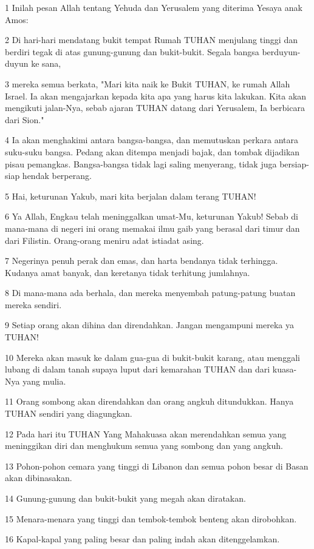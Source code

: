 \par 1 Inilah pesan Allah tentang Yehuda dan Yerusalem yang diterima Yesaya anak Amos:
\par 2 Di hari-hari mendatang bukit tempat Rumah TUHAN menjulang tinggi dan berdiri tegak di atas gunung-gunung dan bukit-bukit. Segala bangsa berduyun-duyun ke sana,
\par 3 mereka semua berkata, "Mari kita naik ke Bukit TUHAN, ke rumah Allah Israel. Ia akan mengajarkan kepada kita apa yang harus kita lakukan. Kita akan mengikuti jalan-Nya, sebab ajaran TUHAN datang dari Yerusalem, Ia berbicara dari Sion."
\par 4 Ia akan menghakimi antara bangsa-bangsa, dan memutuskan perkara antara suku-suku bangsa. Pedang akan ditempa menjadi bajak, dan tombak dijadikan pisau pemangkas. Bangsa-bangsa tidak lagi saling menyerang, tidak juga bersiap-siap hendak berperang.
\par 5 Hai, keturunan Yakub, mari kita berjalan dalam terang TUHAN!
\par 6 Ya Allah, Engkau telah meninggalkan umat-Mu, keturunan Yakub! Sebab di mana-mana di negeri ini orang memakai ilmu gaib yang berasal dari timur dan dari Filistin. Orang-orang meniru adat istiadat asing.
\par 7 Negerinya penuh perak dan emas, dan harta bendanya tidak terhingga. Kudanya amat banyak, dan keretanya tidak terhitung jumlahnya.
\par 8 Di mana-mana ada berhala, dan mereka menyembah patung-patung buatan mereka sendiri.
\par 9 Setiap orang akan dihina dan direndahkan. Jangan mengampuni mereka ya TUHAN!
\par 10 Mereka akan masuk ke dalam gua-gua di bukit-bukit karang, atau menggali lubang di dalam tanah supaya luput dari kemarahan TUHAN dan dari kuasa-Nya yang mulia.
\par 11 Orang sombong akan direndahkan dan orang angkuh ditundukkan. Hanya TUHAN sendiri yang diagungkan.
\par 12 Pada hari itu TUHAN Yang Mahakuasa akan merendahkan semua yang meninggikan diri dan menghukum semua yang sombong dan yang angkuh.
\par 13 Pohon-pohon cemara yang tinggi di Libanon dan semua pohon besar di Basan akan dibinasakan.
\par 14 Gunung-gunung dan bukit-bukit yang megah akan diratakan.
\par 15 Menara-menara yang tinggi dan tembok-tembok benteng akan dirobohkan.
\par 16 Kapal-kapal yang paling besar dan paling indah akan ditenggelamkan.
